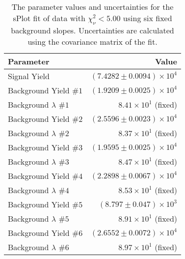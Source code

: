 
\begin{table}[ht]
    \begin{center}
        \begin{tabular}{lr}\toprule
            Parameter & Value \\\midrule
            Signal Yield & $(7.4282 \pm 0.0094) \times 10^{4}$ \\
            Background Yield $\#1$ & $(1.9209 \pm 0.0025) \times 10^{4}$ \\
            Background $\lambda$ $\#1$ & $8.41 \times 10^{1}$ (fixed) \\
            Background Yield $\#2$ & $(2.5596 \pm 0.0023) \times 10^{4}$ \\
            Background $\lambda$ $\#2$ & $8.37 \times 10^{1}$ (fixed) \\
            Background Yield $\#3$ & $(1.9595 \pm 0.0025) \times 10^{4}$ \\
            Background $\lambda$ $\#3$ & $8.47 \times 10^{1}$ (fixed) \\
            Background Yield $\#4$ & $(2.2898 \pm 0.0067) \times 10^{4}$ \\
            Background $\lambda$ $\#4$ & $8.53 \times 10^{1}$ (fixed) \\
            Background Yield $\#5$ & $(8.797 \pm 0.047) \times 10^{3}$ \\
            Background $\lambda$ $\#5$ & $8.91 \times 10^{1}$ (fixed) \\
            Background Yield $\#6$ & $(2.6552 \pm 0.0072) \times 10^{4}$ \\
            Background $\lambda$ $\#6$ & $8.97 \times 10^{1}$ (fixed) \\\bottomrule
        \end{tabular}
        \caption{The parameter values and uncertainties for the sPlot fit of data with $\chi^2_\nu < 5.00$ using six fixed background slopes. Uncertainties are calculated using the covariance matrix of the fit.}\label{tab:splot-fit-results-chisqdof-5.00-fixed-6}
    \end{center}
\end{table}
